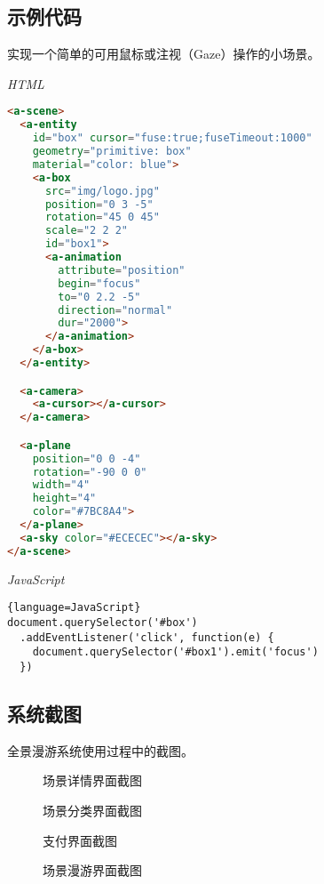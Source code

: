 \subsection{示例代码}
实现一个简单的可用鼠标或注视（Gaze）操作的小场景。

\emph{HTML}
\begin{lstlisting}[language=HTML]
<a-scene>
  <a-entity
    id="box" cursor="fuse:true;fuseTimeout:1000"
    geometry="primitive: box"
    material="color: blue">
    <a-box
      src="img/logo.jpg"
      position="0 3 -5"
      rotation="45 0 45"
      scale="2 2 2"
      id="box1">
      <a-animation
        attribute="position"
        begin="focus"
        to="0 2.2 -5"
        direction="normal"
        dur="2000">
      </a-animation>
    </a-box>
  </a-entity>

  <a-camera>
    <a-cursor></a-cursor>
  </a-camera>

  <a-plane 
    position="0 0 -4" 
    rotation="-90 0 0" 
    width="4" 
    height="4" 
    color="#7BC8A4">
  </a-plane>
  <a-sky color="#ECECEC"></a-sky>
</a-scene>
\end{lstlisting} 

\emph{JavaScript}
\begin{lstlisting}{language=JavaScript}
document.querySelector('#box')
  .addEventListener('click', function(e) {
    document.querySelector('#box1').emit('focus')
  })
\end{lstlisting}

\subsection{系统截图}
全景漫游系统使用过程中的截图。

\begin{figure}[htp]
\centering
{}
\caption{场景详情界面截图}
\label{fig:app1}
\end{figure}

\begin{figure}[htp]
\centering
{}
\caption{场景分类界面截图}
\label{fig:app4}
\end{figure}

\begin{figure}[htp]
\centering
{}
\caption{支付界面截图}
\label{fig:app2}
\end{figure}

\begin{figure}[htp]
\centering
{}
\caption{场景漫游界面截图}
\label{fig:app3}
\end{figure}